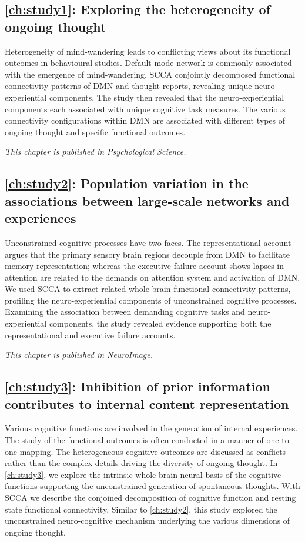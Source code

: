 \subsection*{\cref{ch:study1}: Exploring the heterogeneity of ongoing thought}
Heterogeneity of mind-wandering leads to conflicting views about its functional outcomes in behavioural studies. Default mode network is commonly associated with the emergence of mind-wandering. SCCA conjointly decomposed functional connectivity patterns of DMN and thought reports, revealing unique neuro-experiential components. The study then revealed that the neuro-experiential components each associated with unique cognitive task measures. The various connectivity configurations within DMN are associated with different types of ongoing thought and specific functional outcomes.

\textit{This chapter is published in Psychological Science.}

\subsection*{\cref{ch:study2}: Population variation in the associations between large-scale networks and experiences}
Unconstrained cognitive processes have two faces. The representational account argues that the primary sensory brain regions decouple from DMN to facilitate memory representation; whereas the executive failure account shows lapses in attention are related to the demands on attention system and activation of DMN. We used SCCA to extract related whole-brain functional connectivity patterns, profiling the neuro-experiential components of unconstrained cognitive processes. Examining the association between demanding cognitive tasks and neuro-experiential components, the study revealed evidence supporting both the representational and executive failure accounts.

\textit{This chapter is published in NeuroImage.}

\subsection*{\cref{ch:study3}: Inhibition of prior information contributes to internal content representation}
Various cognitive functions are involved in the generation of internal experiences. The study of the functional outcomes is often conducted in a manner of one-to-one mapping. The heterogeneous cognitive outcomes are discussed as conflicts rather than the complex details driving the diversity of ongoing thought. In \cref{ch:study3}, we explore the intrinsic whole-brain neural basis of the cognitive functions supporting the unconstrained generation of spontaneous thoughts.  With SCCA we describe the conjoined decomposition of cognitive function and resting state functional connectivity. Similar to \cref{ch:study2}, this study explored the unconstrained neuro-cognitive mechanism underlying the various dimensions of ongoing thought.

